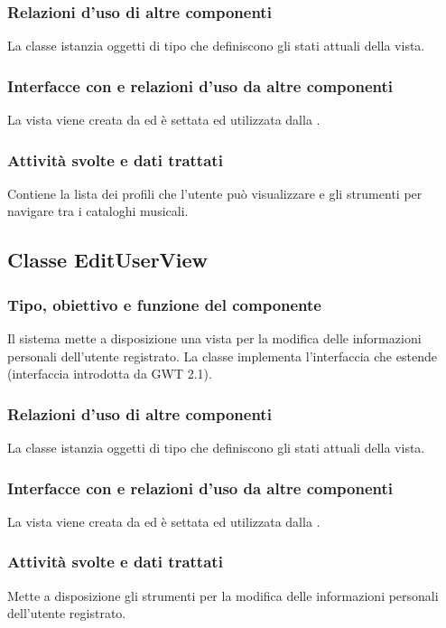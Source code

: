 \subsubsection*{Relazioni d'uso di altre componenti} 
La classe istanzia oggetti di tipo  che definiscono gli stati
attuali della vista.
\subsubsection*{Interfacce con e relazioni d'uso da altre componenti}
 La vista viene creata da  ed \`e settata ed utilizzata dalla
 .
 \subsubsection*{Attivit\`a svolte e dati trattati}
Contiene la lista dei profili che l'utente pu\`o visualizzare e gli strumenti
per navigare tra i cataloghi musicali.

\subsection{Classe EditUserView}
\subsubsection*{Tipo, obiettivo e funzione del componente}
Il sistema mette a disposizione una vista per la
modifica delle informazioni personali dell'utente registrato. La classe
 implementa l'interfaccia  che estende
 (interfaccia introdotta da GWT 2.1).

\subsubsection*{Relazioni d'uso di altre componenti}
La classe istanzia oggetti di tipo  che definiscono gli stati
attuali della vista.
\subsubsection*{Interfacce con e relazioni d'uso da altre componenti}
La vista viene creata da  ed \`e settata ed utilizzata dalla
.
\subsubsection*{Attivit\`a svolte e dati trattati}
Mette a disposizione gli strumenti per la modifica delle informazioni personali
dell'utente registrato.

